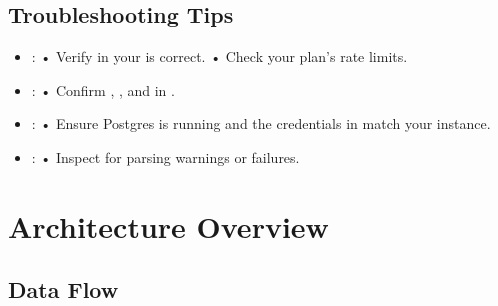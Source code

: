 \documentclass[letterpaper,10pt,english]{sphinxmanual}
\begin{document}
\section{Troubleshooting Tips}
\label{\detokenize{usage_instructions:troubleshooting-tips}}\begin{itemize}
\item {} 
\sphinxAtStartPar
{}:
• Verify  in your  is correct.
• Check your plan’s rate limits.

\item {} 
\sphinxAtStartPar
{}:
• Confirm , ,  and  in .

\item {} 
\sphinxAtStartPar
{}:
• Ensure Postgres is running and the  credentials in  match your instance.

\item {} 
\sphinxAtStartPar
{}:
• Inspect  for parsing warnings or failures.

\end{itemize}

\sphinxstepscope


\chapter{Architecture Overview}
\label{\detokenize{architecture_overview:architecture-overview}}\label{\detokenize{architecture_overview::doc}}

\section{Data Flow}
\label{\detokenize{architecture_overview:data-flow}}
\end{document}
